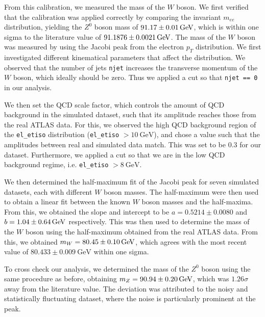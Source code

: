 \documentclass[a4paper]{report}
\numberwithin{equation}{section}
\begin{document}
From this calibration, we measured the mass of the $W$ boson. We first verified that the calibration was applied correctly by 
comparing the invariant $m_{ee}$ distribution, yielding the $Z^0$ boson mass of $\SI{91.17 \pm 0.01}{\giga\electronvolt}$, which 
is within one sigma to the literature value of $\SI{91.1876 \pm 0.0021}{\giga\electronvolt}$. The mass of the $W$ boson was measured by using the Jacobi peak from the 
electron $p_T$ distribution. We first investigated different kinematical parameters that affect the distribution. We observed 
that the number of jets \texttt{njet} increases the transverse momentum of the $W$ boson, which ideally should be zero. Thus we 
applied a cut so that \texttt{njet == 0} in our analysis.

We then set the QCD scale factor, which controls the amount of QCD background in the simulated 
dataset, such that its amplitude reaches those from the real ATLAS data. For this, we observed the high QCD background 
region of the \texttt{el\_etiso} distribution (\texttt{el\_etiso} $> \SI{10}{\giga\electronvolt}$), and chose a value such that 
the amplitudes between real and simulated data match. This was set to be 0.3 for our dataset. Furthermore, we applied a cut 
so that we are in the low QCD background regime, i.e. \texttt{el\_etiso} $> \SI{8}{\giga\electronvolt}$. \par 

We then determined the half-maximum fit of the Jacobi peak for seven simulated datasets, each with different $W$ boson masses. 
The half-maximum were then used to obtain a linear fit between the known $W$ boson masses and the half-maxima. From this, we obtained 
the slope and intercept to be $a = 0.5214 \pm 0.0080$ and $b = \SI{1.04 \pm 0.64}{\giga\electronvolt}$ respectively. This was then 
used to determine the mass of the $W$ boson using the half-maximum obtained from the real ATLAS data. From this, we obtained 
$m_W = \SI{80.45 \pm 0.10}{\giga\electronvolt}$, which agrees with the most recent value of $80.433 \pm 0.009 \ \text{GeV}$ 
within one sigma. \par 

To cross check our analysis, we determined the mass of the $Z^0$ boson using the same procedure as before, obtaining 
$m_Z = \SI{90.94 \pm 0.20}{\giga\electronvolt}$, which was $1.26\sigma$ away from the literature value. The deviation was attributed 
to the noisy and statistically fluctuating dataset, where the noise is particularly prominent at the peak. \par 
\end{document}
